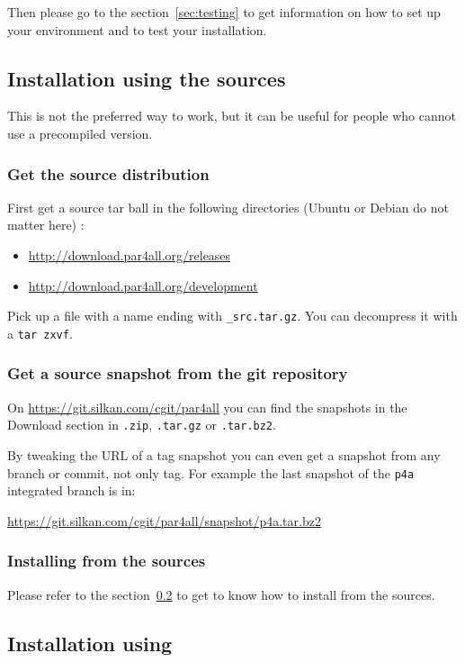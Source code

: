 \documentclass[a4paper]{article}
\begin{document}
Then please go to the section~\ref{sec:testing} to get information on how
to set up your environment and to test your installation.


\subsection{Installation using the sources}

This is not the preferred way to work, but it can be useful for people who
cannot use a precompiled version.


\subsubsection{Get the source distribution}
First get a source tar ball in the following directories (Ubuntu or Debian
do not matter here) :
\begin{itemize}
\item \protect\url{http://download.par4all.org/releases}
\item \protect\url{http://download.par4all.org/development}
\end{itemize}

Pick up a file with a name ending with \texttt{\_src.tar.gz}. You can
decompress it with a \texttt{tar zxvf}.


\subsubsection{Get a source snapshot from the git repository}

On \url{https://git.silkan.com/cgit/par4all} you can find the
snapshots in the Download section in \texttt{.zip}, \texttt{.tar.gz} or
\texttt{.tar.bz2}.

By tweaking the URL of a tag snapshot you can even get a snapshot from any
branch or commit, not only tag. For example the last snapshot of the
\texttt{p4a} integrated branch is in:

\url{https://git.silkan.com/cgit/par4all/snapshot/p4a.tar.bz2}


\subsubsection{Installing from the sources}
Please refer to the section~\ref{sec:installation_using git} to get to
know how to install \Apfa from the sources.


\subsection{Installation using \protect\Agit}
\label{sec:installation_using git}
\end{document}
